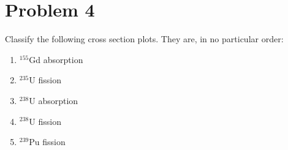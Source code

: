 \documentclass{report}
\begin{document}
\newpage
\section*{Problem 4}

Classify the following cross section plots. They are, in no particular order:
\begin{enumerate}[(1)]
\item $^{155}$Gd absorption
\item $^{235}$U fission
\item $^{238}$U absorption
\item $^{238}$U fission
\item $^{239}$Pu fission
\end{enumerate}
\end{document}
